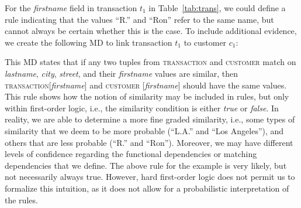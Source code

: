 For the \textsl{firstname} field in transaction $t_1$ in Table~\ref{tab:trans}, we could define a rule indicating that the values ``R.'' and ``Ron'' refer to the same name, but cannot always be certain whether this is the case. To include additional evidence, we create the following MD to link transaction $t_1$ to customer $c_1$:\\ 
\vspace*{-0.5cm}
\begin{table}[h]\footnotesize
\scriptsize
\centering
{}
\end{table}
\vspace*{-0.5cm}

This MD states that if any two tuples from \textsc{transaction} and \textsc{customer} match on \textsl{lastname}, \textsl{city}, \textsl{street}, and their \textsl{firstname} values are similar, then \textsc{transaction}[\textsl{firstname}] and \textsc{customer} [\textsl{firstname}] should have the same values. This rule shows how the notion of similarity may be included in rules, but only within first-order logic, i.e., the similarity condition is either \emph{true} or \emph{false}. In reality, we are able to determine a more fine graded similarity, i.e., some types of similarity that we deem to be more probable (``L.A.'' and ``Los Angeles''), and others that are less probable (``R.'' and ``Ron''). Moreover, we may have different levels of confidence regarding the functional dependencies or matching dependencies that we define. The above rule for the example is very likely, but not necessarily always true. However, hard first-order logic does not permit us to formalize this intuition, as it does not allow for a probabilistic interpretation of the rules.
